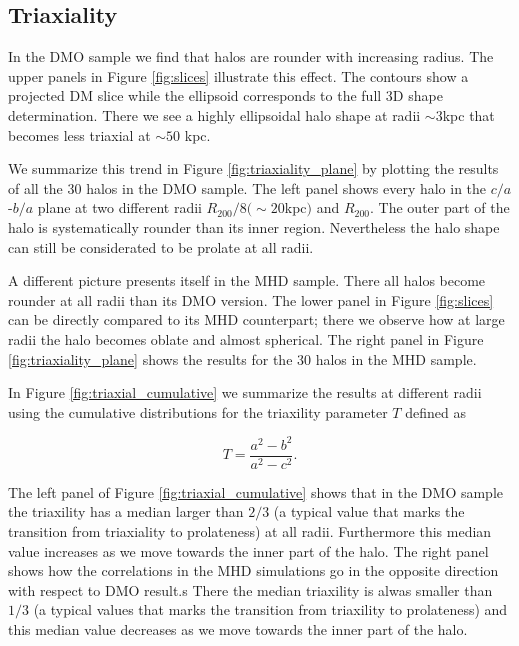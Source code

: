 \documentclass[usenatbib]{mnras}
\begin{document}
\subsection{Triaxiality}

In the DMO sample we find that halos are rounder with increasing
radius.
The upper panels in Figure \ref{fig:slices} illustrate this effect.
The contours show a projected DM slice while the ellipsoid corresponds
to the full 3D shape determination. 
There we see a highly ellipsoidal halo shape at radii $\sim 3$kpc
that becomes less triaxial at $\sim 50$ kpc.

We summarize this trend in Figure \ref{fig:triaxiality_plane} by
plotting the results of all the 30 halos in the DMO sample.
The left panel shows every halo in the $c/a$-$b/a$ plane at
two different radii $R_{200}/8 (\sim 20$kpc$)$ and $R_{200}$. 
The outer part of the halo is systematically rounder than its inner
region. 
Nevertheless the halo shape can still be considerated to be prolate at
all radii. 

A different picture presents itself in the MHD sample.
There all halos become rounder at all radii than its DMO
version.
The lower panel in Figure \ref{fig:slices} can be directly compared to
its MHD counterpart; there we observe how at large radii the halo
becomes oblate and almost spherical. 
The right panel in Figure \ref{fig:triaxiality_plane} shows the
results for the 30 halos in the MHD sample.

In Figure \ref{fig:triaxial_cumulative} we summarize the results at
different radii using the cumulative distributions for the 
triaxility parameter $T$ defined as 

\begin{equation}
T=\frac{a^2-b^2}{a^2-c^2}.
\label{eq:triaxiality}
\end{equation}

The left panel of Figure \ref{fig:triaxial_cumulative} shows that in
the DMO sample the triaxility has a median larger than $2/3$ (a
typical value that marks the transition from triaxiality to
prolateness) at all radii. 
Furthermore this median value increases as we move towards the inner part of the
halo.
The right panel shows how the correlations in the MHD simulations go
in the opposite direction with respect to DMO result.s
There the median triaxility is alwas smaller than $1/3$ (a typical
values that marks the transition from triaxility to prolateness) and this
median value decreases as we move towards the inner part of the halo.
\end{document}
